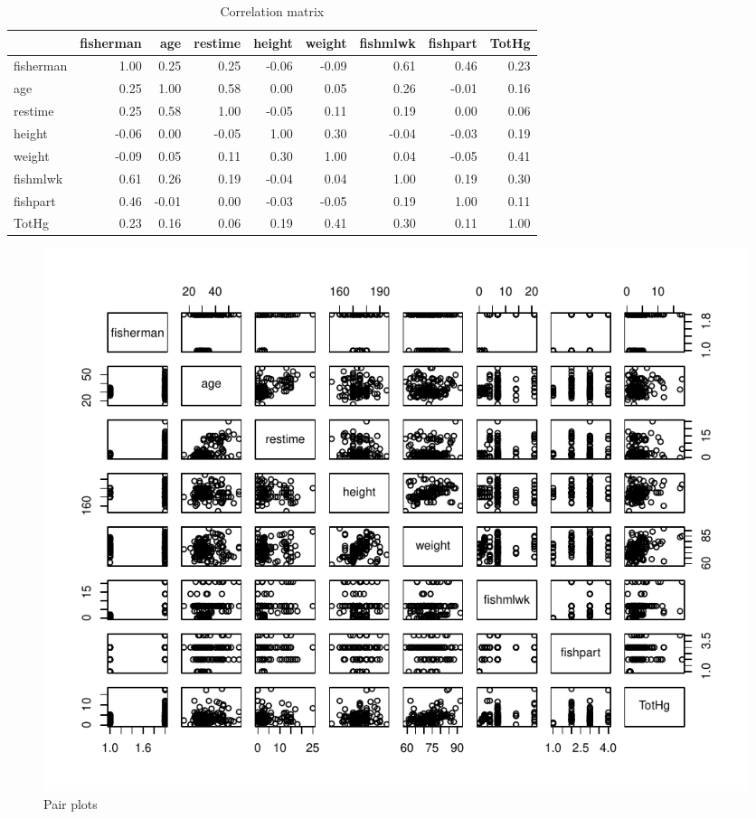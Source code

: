 \documentclass[12pt,]{article}
\begin{document}
\begin{table}[t]

\caption{\label{tab:unnamed-chunk-7}\label{tbl:correlation}Correlation matrix}
\centering
\begin{tabular}{l|r|r|r|r|r|r|r|r}
\hline
  & fisherman & age & restime & height & weight & fishmlwk & fishpart & TotHg\\
\hline
\rowcolor{gray!6}  fisherman & 1.00 & 0.25 & 0.25 & -0.06 & -0.09 & 0.61 & 0.46 & 0.23\\
\hline
age & 0.25 & 1.00 & 0.58 & 0.00 & 0.05 & 0.26 & -0.01 & 0.16\\
\hline
\rowcolor{gray!6}  restime & 0.25 & 0.58 & 1.00 & -0.05 & 0.11 & 0.19 & 0.00 & 0.06\\
\hline
height & -0.06 & 0.00 & -0.05 & 1.00 & 0.30 & -0.04 & -0.03 & 0.19\\
\hline
\rowcolor{gray!6}  weight & -0.09 & 0.05 & 0.11 & 0.30 & 1.00 & 0.04 & -0.05 & 0.41\\
\hline
fishmlwk & 0.61 & 0.26 & 0.19 & -0.04 & 0.04 & 1.00 & 0.19 & 0.30\\
\hline
\rowcolor{gray!6}  fishpart & 0.46 & -0.01 & 0.00 & -0.03 & -0.05 & 0.19 & 1.00 & 0.11\\
\hline
TotHg & 0.23 & 0.16 & 0.06 & 0.19 & 0.41 & 0.30 & 0.11 & 1.00\\
\hline
\end{tabular}
\end{table}

\begin{figure}
\centering
\includegraphics{Report_files/figure-latex/unnamed-chunk-8-1.pdf}
\caption{\label{fig:pair_plots}Pair plots}
\end{figure}
\end{document}
